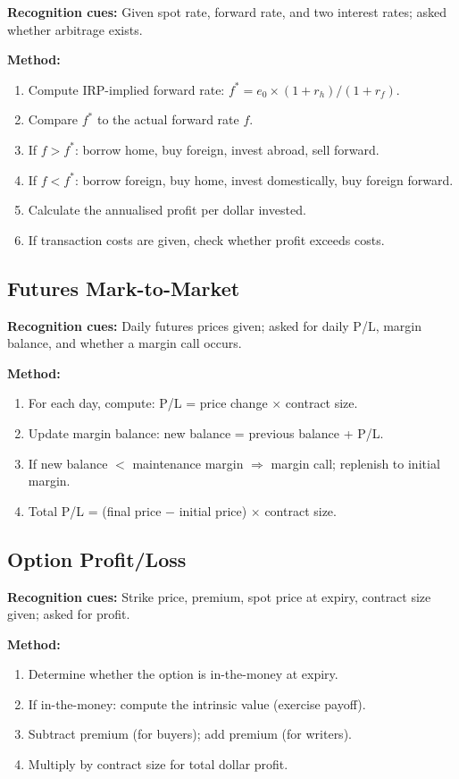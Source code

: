 \documentclass[11pt,a4paper]{article}
\begin{document}
\textbf{Recognition cues:} Given spot rate, forward rate, and two interest rates; asked whether arbitrage exists.

\textbf{Method:}
\begin{enumerate}
  \item Compute IRP-implied forward rate: $f^* = e_0 \times (1+r_h)/(1+r_f)$.
  \item Compare $f^*$ to the actual forward rate $f$.
  \item If $f > f^*$: borrow home, buy foreign, invest abroad, sell forward.
  \item If $f < f^*$: borrow foreign, buy home, invest domestically, buy foreign forward.
  \item Calculate the annualised profit per dollar invested.
  \item If transaction costs are given, check whether profit exceeds costs.
\end{enumerate}

\subsection{Futures Mark-to-Market}

\textbf{Recognition cues:} Daily futures prices given; asked for daily P/L, margin balance, and whether a margin call occurs.

\textbf{Method:}
\begin{enumerate}
  \item For each day, compute: P/L = price change $\times$ contract size.
  \item Update margin balance: new balance = previous balance + P/L.
  \item If new balance $<$ maintenance margin $\Rightarrow$ margin call; replenish to initial margin.
  \item Total P/L = (final price $-$ initial price) $\times$ contract size.
\end{enumerate}

\subsection{Option Profit/Loss}

\textbf{Recognition cues:} Strike price, premium, spot price at expiry, contract size given; asked for profit.

\textbf{Method:}
\begin{enumerate}
  \item Determine whether the option is in-the-money at expiry.
  \item If in-the-money: compute the intrinsic value (exercise payoff).
  \item Subtract premium (for buyers); add premium (for writers).
  \item Multiply by contract size for total dollar profit.
\end{enumerate}
\end{document}
